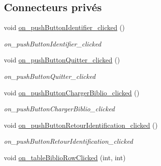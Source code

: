 \subsection*{Connecteurs privés}
\begin{DoxyCompactItemize}
\item 
\mbox{\label{classMainWindow_a288eee5287611da2b2e5844478e7c928}} 
void \hyperlink{classMainWindow_a288eee5287611da2b2e5844478e7c928}{on\+\_\+push\+Button\+Identifier\+\_\+clicked} ()
\begin{DoxyCompactList}\small\item\em on\+\_\+push\+Button\+Identifier\+\_\+clicked \end{DoxyCompactList}\item 
\mbox{\label{classMainWindow_a94045fe84db5691c70d2bb3e806f0812}} 
void \hyperlink{classMainWindow_a94045fe84db5691c70d2bb3e806f0812}{on\+\_\+push\+Button\+Quitter\+\_\+clicked} ()
\begin{DoxyCompactList}\small\item\em on\+\_\+push\+Button\+Quitter\+\_\+clicked \end{DoxyCompactList}\item 
\mbox{\label{classMainWindow_a46c11c6c090ccb3cd8f9584c2b9dbf48}} 
void \hyperlink{classMainWindow_a46c11c6c090ccb3cd8f9584c2b9dbf48}{on\+\_\+push\+Button\+Charger\+Biblio\+\_\+clicked} ()
\begin{DoxyCompactList}\small\item\em on\+\_\+push\+Button\+Charger\+Biblio\+\_\+clicked \end{DoxyCompactList}\item 
\mbox{\label{classMainWindow_a141877383fb575d9e847e22ac7d274c7}} 
void \hyperlink{classMainWindow_a141877383fb575d9e847e22ac7d274c7}{on\+\_\+push\+Button\+Retour\+Identification\+\_\+clicked} ()
\begin{DoxyCompactList}\small\item\em on\+\_\+push\+Button\+Retour\+Identification\+\_\+clicked \end{DoxyCompactList}\item 
\mbox{\label{classMainWindow_a97069de59e1201e639a2dc064e6d2427}} 
void \hyperlink{classMainWindow_a97069de59e1201e639a2dc064e6d2427}{on\+\_\+table\+Biblio\+Row\+Clicked} (int, int)

\end{DoxyCompactItemize}

